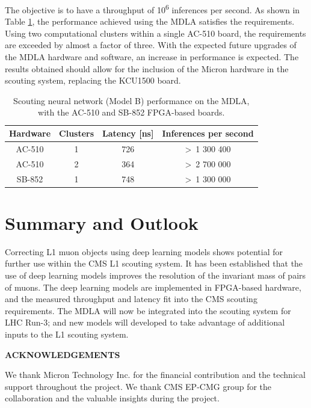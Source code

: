 \documentclass[10pt, paper=a4, UKenglish]{article}
\def\Acknowledgements{\bigskip  \bigskip \begin{center} \begin{large}
      \bf ACKNOWLEDGEMENTS \end{large}\end{center}}
\begin{document}
The objective is to have a throughput of 10\textsuperscript{6} inferences per second. As shown in Table \ref{tab:DLA_perf}, the performance achieved using the MDLA satisfies the requirements. Using two computational clusters within a single AC-510 board, the requirements are exceeded by almost a factor of three. With the expected future upgrades of the MDLA hardware and software, an increase in performance is expected. The results obtained should allow for the inclusion of the Micron hardware in the scouting system, replacing the KCU1500 board.

\begin{table}[!htb]
\setlength{\belowcaptionskip}{-20pt}
  \begin{center}
    \begin{tabular}{|c|c|c|c|}
      \hline
      Hardware & Clusters & Latency [ns] & Inferences per second \\
      \hline
      AC-510 & 1 & 726 & \textgreater~1 300 400 \\
      \hline
      AC-510 & 2 & 364 & \textgreater~2 700 000 \\
      \hline
      SB-852 & 1 & 748 & \textgreater~1 300 000 \\
      \hline
    \end{tabular}
    \caption{Scouting neural network (Model B) performance on the MDLA, with the AC-510 and SB-852 FPGA-based boards.}
    \label{tab:DLA_perf}
  \end{center}
\end{table}

\section{Summary and Outlook}

Correcting L1 muon objects using deep learning models shows potential for further use within the CMS L1 scouting system. It has been established that the use of deep learning models improves the resolution of the invariant mass of pairs of muons. The deep learning models are implemented in FPGA-based hardware, and the measured throughput and latency fit into the CMS scouting requirements. The MDLA will now be integrated into the scouting system for LHC Run-3; and new models will developed to take advantage of additional inputs to the L1 scouting system.

\Acknowledgements
We thank Micron Technology Inc. for the financial contribution and the technical support throughout the project. We thank CMS EP-CMG group for the collaboration and the valuable insights during the project.
\end{document}
